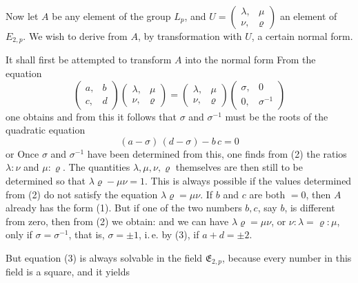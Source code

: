 Now let $A$ be any element of the group $L_p$,
and $U = \begin{pmatrix} \lambda, & \mu \\ \nu, & \varrho \end{pmatrix}$ an element of $E_{2,p}$. We wish to derive from $A$, by
transformation with $U$, a certain normal form.

It shall first be attempted to transform $A$ into the normal form
From the equation
\[
\begin{pmatrix} a, & b \\ c, & d \end{pmatrix} \begin{pmatrix} \lambda, & \mu \\ \nu, & \varrho \end{pmatrix} = \begin{pmatrix} \lambda, & \mu \\ \nu, & \varrho \end{pmatrix} \begin{pmatrix} \sigma, & 0 \\ 0, & \sigma^{-1} \end{pmatrix}
\]
one obtains
and from this it follows that $\sigma$ and $\sigma^{-1}$ must be the roots of the quadratic
equation
\[
(a-\sigma)\,(d-\sigma) - b\,c = 0
\]
or
Once $\sigma$ and $\sigma^{-1}$ have been determined from this, one finds
from (2) the ratios $\lambda : \nu$ and $\mu : \varrho$. The quantities $\lambda, \mu, \nu, \varrho$
themselves are then still to be determined so that $\lambda\varrho - \mu\nu = 1$.
This is always possible if the values determined from (2)
do not satisfy the equation $\lambda\varrho = \mu\nu$. If $b$ and $c$ are both $= 0$,
then $A$ already has the form (1). But if one of the two numbers
$b, c$, say $b$, is different from zero, then from (2) we obtain:
and we can have $\lambda\varrho = \mu\nu$, or $\nu : \lambda = \varrho : \mu$, only if
$\sigma = \sigma^{-1}$, that is, $\sigma = \pm 1$, i.\,e. by (3), if $a + d = \pm 2$.

But equation (3) is always solvable in the field $\mathfrak{E}_{2,p}$, because
every  number in this field is a square, and it yields

